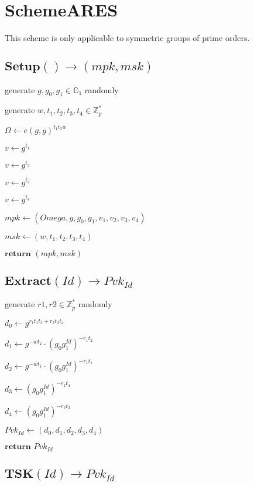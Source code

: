 \documentclass[a4paper]{article}
\begin{document}
\section{SchemeARES}

This scheme is only applicable to symmetric groups of prime orders. 

\subsection{$\textbf{Setup}() \rightarrow (\textit{mpk}, \textit{msk})$}

generate $g, g_0, g_1 \in \mathbb{G}_1$ randomly

generate $w, t_1, t_2, t_3, t_4 \in \mathbb{Z}_p^*$

$\Omega \gets e(g, g)^{t_1 t_2 w}$

$v \gets g^{t_1}$

$v \gets g^{t_2}$

$v \gets g^{t_3}$

$v \gets g^{t_4}$

$\textit{mpk} \gets (Omega, g, g_0, g_1, v_1, v_2, v_3, v_4)$

$\textit{msk} \gets (w, t_1, t_2, t_3, t_4)$

$\textbf{return }(\textit{mpk}, \textit{msk})$

\subsection{$\textbf{Extract}(\textit{Id}) \rightarrow \textit{Pvk}_\textit{Id}$}

generate $r1, r2 \in \mathbb{Z}_p^*$ randomly

$d_0 \gets g^{r_1 t_1 t_2 + r_2 t_3 t_4}$

$d_1 \gets g^{- w t_2} \cdot (g_0 g_1^\textit{Id})^{-  r_1 t_2}$

$d_2 \gets g^{- w t_1} \cdot (g_0 g_1^\textit{Id})^{-  r_1 t_1}$

$d_3 \gets (g_0 g_1^\textit{Id})^{-  r_2 t_4}$

$d_4 \gets (g_0 g_1^\textit{Id})^{-  r_2 t_3}$

$\textit{Pvk}_\textit{Id} \gets (d_0, d_1, d_2, d_3, d_4)$

$\textbf{return }\textit{Pvk}_\textit{Id}$

\subsection{$\textbf{TSK}(\textit{Id}) \rightarrow \textit{Pvk}_\textit{Id}$}
\end{document}

